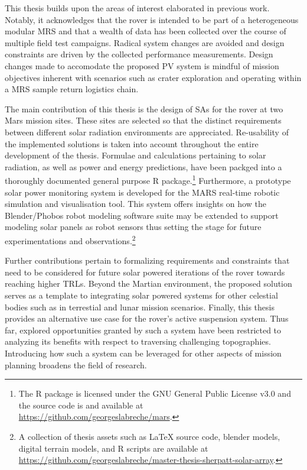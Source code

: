This thesis builds upon the areas of interest elaborated in previous work. Notably, it acknowledges that the rover is intended to be part of a heterogeneous modular \ac{MRS} and that a wealth of data has been collected over the course of multiple field test campaigns. Radical system changes are avoided and design constraints are driven by the collected performance measurements. Design changes made to accomodate the proposed \ac{PV} system is mindful of mission objectives inherent with scenarios such as crater exploration and operating within a \ac{MRS} sample return logistics chain.

The main contribution of this thesis is the design of \acp{SA} for the rover at two Mars mission sites. These sites are selected so that the distinct requirements between different solar radiation environments are appreciated. Re-usability of the implemented solutions is taken into account throughout the entire development of the thesis. Formulae and calculations pertaining to solar radiation, as well as power and energy predictions, have been packged into a thoroughly documented general purpose R package.\footnote{The R package is licensed under the
GNU General Public License v3.0 and the source code is and available at \url{https://github.com/georgeslabreche/mars}.} Furthermore, a prototype solar power monitoring system is developed for the MARS real-time robotic simulation and visualisation tool. This system offers insights on how the Blender/Phobos robot modeling software suite may be extended to support modeling solar panels as robot sensors thus setting the stage for future experimentations and observations.\footnote{A collection of thesis assets such as LaTeX source code, blender models, digital terrain models, and R scripts are available at \url{https://github.com/georgeslabreche/master-thesis-sherpatt-solar-array}.}

Further contributions pertain to formalizing requirements and constraints that need to be considered for future solar powered iterations of the rover towards reaching higher \acp{TRL}. Beyond the Martian environment, the proposed solution serves as a template to integrating solar powered systems for other celestial bodies such as in terrestial and lunar mission scenarios. Finally, this thesis provides an alternative use case for the rover's active suspension system. Thus far, explored opportunities granted by such a system have been restricted to analyzing its benefits with respect to traversing challenging topographies. Introducing how such a system can be leveraged for other aspects of mission planning broadens the field of research.
